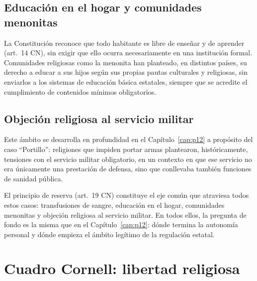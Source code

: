 \documentclass[12pt,oneside]{book}
\begin{document}
\subsection{Educación en el hogar y comunidades menonitas}

La Constitución reconoce que todo habitante es libre de enseñar y de aprender
(art.\ 14 CN), sin exigir que ello ocurra necesariamente en una institución
formal. Comunidades religiosas como la menonita han planteado, en distintos
países, su derecho a educar a sus hijos según sus propias pautas culturales y
religiosas, sin enviarlos a los sistemas de educación básica estatales, siempre
que se acredite el cumplimiento de contenidos mínimos obligatorios.

\subsection{Objeción religiosa al servicio militar}

Este ámbito se desarrolla en profundidad en el Capítulo~\ref{cap:p12} a propósito
del caso ``Portillo'': religiones que impiden portar armas plantearon,
históricamente, tensiones con el servicio militar obligatorio, en un contexto en
que ese servicio no era únicamente una prestación de defensa, sino que conllevaba
también funciones de sanidad pública.

\begin{defbox}
El principio de reserva (art.\ 19 CN) constituye el eje común que atraviesa todos
estos casos: transfusiones de sangre, educación en el hogar, comunidades
menonitas y objeción religiosa al servicio militar. En todos ellos, la pregunta de
fondo es la misma que en el Capítulo~\ref{cap:p12}: dónde termina la autonomía
personal y dónde empieza el ámbito legítimo de la regulación estatal.
\end{defbox}

\section{Cuadro Cornell: libertad religiosa}
\end{document}
